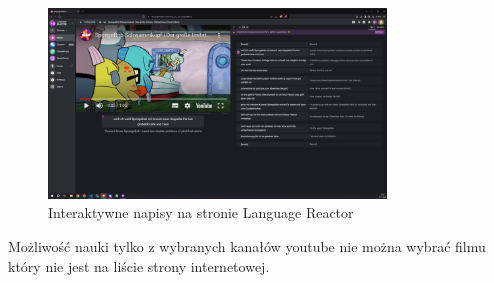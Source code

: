 \begin{figure}[H]
    \centering
    \includegraphics[width=0.8\textwidth]{IMAGE/LanguageReactor.png}
    \caption{Interaktywne napisy na stronie Language Reactor}
    \label{fig:language_reactor}
\end{figure}

Możliwość nauki tylko z wybranych kanałów youtube nie można wybrać filmu który nie jest na liście strony internetowej.
